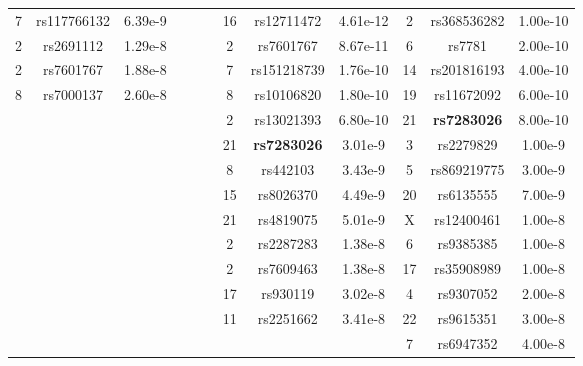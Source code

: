 \begin{adjustwidth}{-3 cm}{-2.5 cm}
\begin{threeparttable}[!htb]
\begin{tabular}{ccc||ccc||ccc||ccc}
			7 &rs117766132 &6.39e-9 & & & &16 &rs12711472 &4.61e-12 &2 &rs368536282 &1.00e-10 \\
			\cellcolor[HTML]{C8C8C8}2 &\cellcolor[HTML]{C8C8C8}rs2691112 &\cellcolor[HTML]{C8C8C8}1.29e-8 & & & &2 &rs7601767 &8.67e-11 &6 &rs7781 &2.00e-10 \\
			\cellcolor[HTML]{C8C8C8}2 &\cellcolor[HTML]{C8C8C8}rs7601767 &\cellcolor[HTML]{C8C8C8}1.88e-8 & & & &7 &rs151218739 &1.76e-10 &14 &rs201816193 &4.00e-10 \\
			\cellcolor[HTML]{C8C8C8}8 &\cellcolor[HTML]{C8C8C8}rs7000137 &\cellcolor[HTML]{C8C8C8}2.60e-8 & & & &8 &rs10106820 &1.80e-10 &19 &rs11672092 &6.00e-10 \\
			& & & & & &2 &rs13021393 &6.80e-10 &21 &\textbf{rs7283026} &8.00e-10 \\
			& & & & & &21 &\textbf{rs7283026} &3.01e-9 &3 &rs2279829 &1.00e-9 \\
			& & & & & &8 &rs442103 &3.43e-9 &5 &rs869219775 &3.00e-9 \\
			& & & & & &15 &rs8026370 &4.49e-9 &20 &rs6135555 &7.00e-9 \\
			& & & & & &21 &rs4819075 &5.01e-9 &\cellcolor[HTML]{C8C8C8}X &\cellcolor[HTML]{C8C8C8}rs12400461 &\cellcolor[HTML]{C8C8C8}1.00e-8 \\
			& & & & & &\cellcolor[HTML]{C8C8C8}2 &\cellcolor[HTML]{C8C8C8}rs2287283 &\cellcolor[HTML]{C8C8C8}1.38e-8 &\cellcolor[HTML]{C8C8C8}6 &\cellcolor[HTML]{C8C8C8}rs9385385 &\cellcolor[HTML]{C8C8C8}1.00e-8 \\
			& & & & & &\cellcolor[HTML]{C8C8C8}2 &\cellcolor[HTML]{C8C8C8}rs7609463 &\cellcolor[HTML]{C8C8C8}1.38e-8 &\cellcolor[HTML]{C8C8C8}17 &\cellcolor[HTML]{C8C8C8}rs35908989 &\cellcolor[HTML]{C8C8C8}1.00e-8 \\
			& & & & & &\cellcolor[HTML]{C8C8C8}17 &\cellcolor[HTML]{C8C8C8}rs930119 &\cellcolor[HTML]{C8C8C8}3.02e-8 &\cellcolor[HTML]{C8C8C8}4 &\cellcolor[HTML]{C8C8C8}rs9307052 &\cellcolor[HTML]{C8C8C8}2.00e-8 \\
			& & & & & &\cellcolor[HTML]{C8C8C8}11 &\cellcolor[HTML]{C8C8C8}rs2251662 &\cellcolor[HTML]{C8C8C8}3.41e-8 &\cellcolor[HTML]{C8C8C8}22 &\cellcolor[HTML]{C8C8C8}rs9615351 &\cellcolor[HTML]{C8C8C8}3.00e-8 \\
			& & & & & & & & &\cellcolor[HTML]{C8C8C8}7 &\cellcolor[HTML]{C8C8C8}rs6947352 &\cellcolor[HTML]{C8C8C8}4.00e-8 \\
			\bottomrule
		\end{tabular}
		\caption[Identified lead \acp{snp} for the entire hemisphere]{Identified lead \acp{snp} for the entire hemisphere across the different datasets, along with a comparison with \citet{Sha2021}. In gray, \acp{snp} with significance less than 1e-8 but greater than 5e-8 are reported. In bold are displayed the variants identified both in the present study and in the work of \citet{Sha2021}.}
		\label{tab:leadsnps}
\end{threeparttable}\end{adjustwidth}


